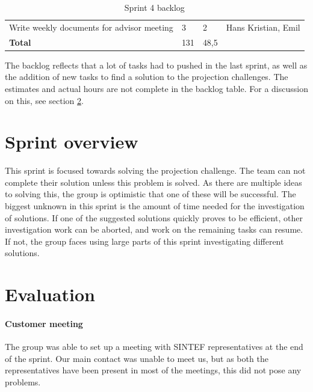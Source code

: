 \documentclass[11pt,a4paper,titlepage,oneside]{report}
\begin{document}
\begin{table}[h]
{\begin{tabular}{llll}
Write weekly documents for advisor meeting                                                           & 3                                                                   & 2                                                      & Hans Kristian, Emil \\
\rowcolor[HTML]{C0C0C0} 
\textbf{Total}                                                                                       & 131                                                                 & 48,5                                                   &                    
\end{tabular}
}
\caption{Sprint 4 backlog}
\label{tab:Sprint4Backlog}
\end{table}

The backlog reflects that a lot of tasks had to pushed in the last sprint, as well as the addition of new tasks to find a solution to the projection challenges. The estimates and actual hours are not complete in the backlog table. For a discussion on this, see section \ref{sec:Sprint4Evaluation}.

\section{Sprint overview}
This sprint is focused towards solving the projection challenge. The team can not complete their solution unless this problem is solved. As there are multiple ideas to solving this, the group is optimistic that one of these will be successful. The biggest unknown in this sprint is the amount of time needed for the investigation of solutions. If one of the suggested solutions quickly proves to be efficient, other investigation work can be aborted, and work on the remaining tasks can resume. If not, the group faces using large parts of this sprint investigating different solutions.

\section{Evaluation}
\label{sec:Sprint4Evaluation}
\paragraph{Customer meeting}
The group was able to set up a meeting with SINTEF representatives at the end of the sprint. Our main contact was unable to meet us, but as both the representatives have been present in most of the meetings, this did not pose any problems. 
\end{document}
